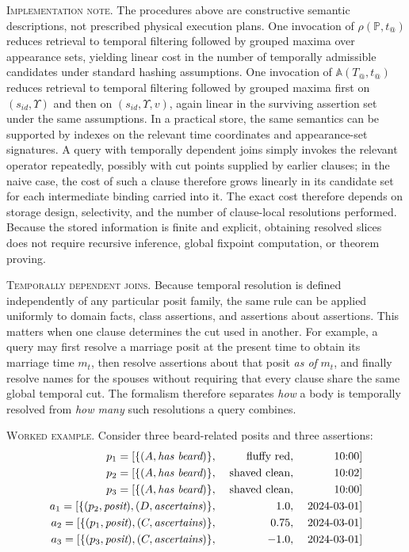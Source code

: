 \documentclass[a4paper,fleqn]{cas-sc}
\begin{document}
\textsc{Implementation note.} The procedures above are constructive semantic descriptions, not prescribed physical execution plans. One invocation of \(\rho(\mathbb{P}, t_@)\) reduces retrieval to temporal filtering followed by grouped maxima over appearance sets, yielding linear cost in the number of temporally admissible candidates under standard hashing assumptions. One invocation of \(\mathbb{A}(T_@, t_@)\) reduces retrieval to temporal filtering followed by grouped maxima first on \((s_{id}, \Upsilon)\) and then on \((s_{id}, \Upsilon, v)\), again linear in the surviving assertion set under the same assumptions. In a practical store, the same semantics can be supported by indexes on the relevant time coordinates and appearance-set signatures. A query with temporally dependent joins simply invokes the relevant operator repeatedly, possibly with cut points supplied by earlier clauses; in the naive case, the cost of such a clause therefore grows linearly in its candidate set for each intermediate binding carried into it. The exact cost therefore depends on storage design, selectivity, and the number of clause-local resolutions performed. Because the stored information is finite and explicit, obtaining resolved slices does not require recursive inference, global fixpoint computation, or theorem proving.

\textsc{Temporally dependent joins.} Because temporal resolution is defined independently of any particular posit family, the same rule can be applied uniformly to domain facts, class assertions, and assertions about assertions. This matters when one clause determines the cut used in another. For example, a query may first resolve a marriage posit at the present time to obtain its marriage time \(m_t\), then resolve assertions about that posit \emph{as of} \(m_t\), and finally resolve names for the spouses without requiring that every clause share the same global temporal cut. The formalism therefore separates \emph{how} a body is temporally resolved from \emph{how many} such resolutions a query combines.

\textsc{Worked example.} Consider three beard-related posits and three assertions:
\begin{alignat*}{3}
p_{1} = [\{(A, \textit{has beard})\},\;&& \textrm{fluffy red},\;&& \textrm{10:00}]  \\
p_{2} = [\{(A, \textit{has beard})\},\;&& \textrm{shaved clean},\;&& \textrm{10:02}]  \\
p_{3} = [\{(A, \textit{has beard})\},\;&& \textrm{shaved clean},\;&& \textrm{10:00}]  \\
a_1 = [\{(p_{2}, \textit{posit}), (D, \textit{ascertains})\},\;&& 1.0,\;&& \textrm{2024\text{-}03\text{-}01}] \\
a_2 = [\{(p_{1}, \textit{posit}), (C, \textit{ascertains})\},\;&& 0.75,\;&& \textrm{2024\text{-}03\text{-}01}] \\
a_3 = [\{(p_{3}, \textit{posit}), (C, \textit{ascertains})\},\;&& -1.0,\;&& \textrm{2024\text{-}03\text{-}01}]
\end{alignat*}
\end{document}
